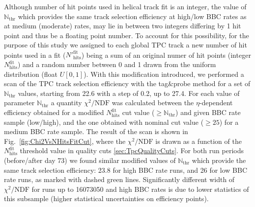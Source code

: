 Although number of hit points used in helical track fit is an integer, the value of $\mathbb{N}_{\text{thr}}$ which provides the same track selection efficiency at high/low BBC rates as at medium (moderate) rates, may lie in between two integers differing by 1 hit point and thus be a floating point number. To account for this possibility, for the purpose of this study we assigned to each global TPC track a new number of hit points used in a fit (${N'}_{\text{hits}}^{\text{fit}}$) being a sum of an original numer of hit points (integer $N_{\text{hits}}^{\text{fit}}$) and a random number between 0 and 1 drawn from the uniform distribution (float $U[0,1]$). With this modification introduced, we performed a scan of the TPC track selection efficiency with the tag\&probe method for a set of $\mathbb{N}_{\text{thr}}$ values, starting from 22.6 with a step of 0.2, up to 27.4. For each value of parameter $\mathbb{N}_{\text{thr}}$ a quantity $\chi^{2}/\text{NDF}$ was calculated between the $\eta$-dependent efficiency obtained for a modified $N_{\text{hits}}^{\text{fit}}$ cut value ($\geq\mathbb{N}_{\text{thr}}$) and given BBC rate sample (low/high), and the one obtained with nominal cut value ($\geq25$) for a medium BBC rate sample. The result of the scan is shown in Fig.~\ref{fig:Chi2VsNHitsFitCut}, where the $\chi^{2}/\text{NDF}$ is drawn as a function of the $N_{\text{hits}}^{\text{fit}}$ threshold value in quality cuts \ref{sec:TpcQualityCuts}. For both run periods (before/after day 73) we found similar modified values of $\mathbb{N}_{\text{thr}}$ which provide the same track selection efficiency: 23.8 for high BBC rate runs, and 26 for low BBC rate runs, as marked with dashed green lines. Significantly different width of $\chi^{2}/\text{NDF}$ for runs up to 16073050 and high BBC rates is due to lower statistics of this subsample (higher statistical uncertainties on efficiency points).

